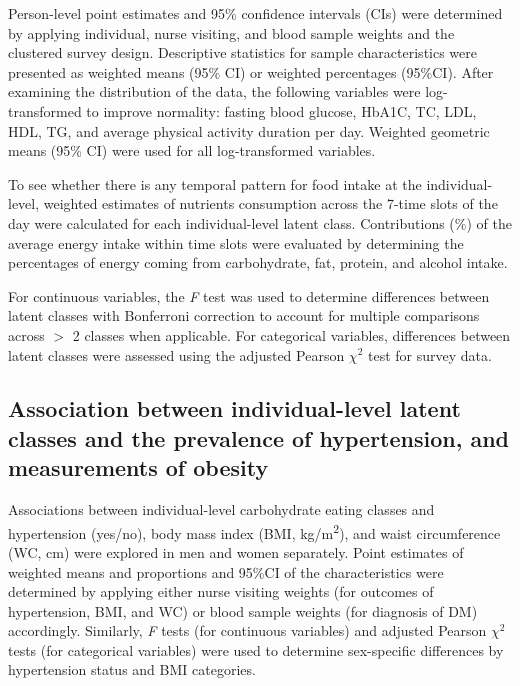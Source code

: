 Person-level point estimates and 95\% confidence intervals (CIs) were determined by applying individual, nurse visiting, and blood sample weights and the clustered survey design. Descriptive statistics for sample characteristics were presented as weighted means (95\% CI) or weighted percentages (95\%CI). After examining the distribution of the data, the following variables were log-transformed to improve normality: fasting blood glucose, HbA1C, TC, LDL, HDL, TG, and average physical activity duration per day. Weighted geometric means (95\% CI) were used for all log-transformed variables. 

To see whether there is any temporal pattern for food intake at the individual-level, weighted estimates of nutrients consumption across the 7-time slots of the day were calculated for each individual-level latent class. Contributions (\%) of the average energy intake within time slots were evaluated by determining the percentages of energy coming from carbohydrate, fat, protein, and alcohol intake. 

For continuous variables, the \textit{F} test was used to determine differences between latent classes with Bonferroni correction to account for multiple comparisons across $>$ 2 classes when applicable. For categorical variables, differences between latent classes were assessed using the adjusted Pearson $\chi^2$ test for survey data.\vspace{-0.5cm}


\subsection{Association between individual-level latent classes and the prevalence of hypertension, and measurements of obesity}\vspace{-0.3cm}


Associations between individual-level carbohydrate eating classes and hypertension (yes/no), body mass index (BMI, kg/m\textsuperscript{2}), and waist circumference (WC, cm) were explored in men and women separately. Point estimates of weighted means and proportions and 95\%CI of the characteristics were determined by applying either nurse visiting weights (for outcomes of hypertension, BMI, and WC) or blood sample weights (for diagnosis of DM) accordingly. Similarly, \textit{F} tests (for continuous variables) and adjusted Pearson $\chi^2$ tests (for categorical variables) were used to determine sex-specific differences by hypertension status and BMI categories. 

